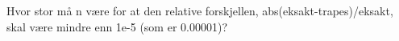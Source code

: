 %
%
Hvor stor må n være for at den relative forskjellen, abs(eksakt-trapes)/eksakt, skal være mindre enn 1e-5 (som er 0.00001)?
